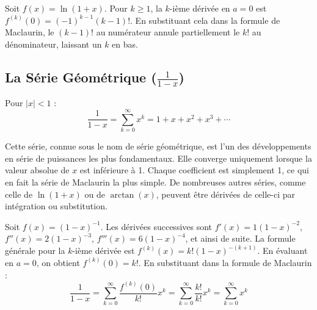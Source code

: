 \begin{proofbox}
Soit $f(x) = \ln(1+x)$. Pour $k \ge 1$, la $k$-ième dérivée en $a=0$ est $f^{(k)}(0) = (-1)^{k-1} (k-1)!$. En substituant cela dans la formule de Maclaurin, le $(k-1)!$ au numérateur annule partiellement le $k!$ au dénominateur, laissant un $k$ en bas.
\end{proofbox}

\subsection{La Série Géométrique ($\frac{1}{1-x}$)}

\begin{theorembox}
Pour $|x| < 1$ :
$$ \frac{1}{1-x} = \sum_{k=0}^{\infty} x^k = 1 + x + x^2 + x^3 + \cdots $$
\end{theorembox}

\begin{intuitionbox}
Cette série, connue sous le nom de série géométrique, est l'un des développements en série de puissances les plus fondamentaux. Elle converge uniquement lorsque la valeur absolue de $x$ est inférieure à 1. Chaque coefficient est simplement 1, ce qui en fait la série de Maclaurin la plus simple. De nombreuses autres séries, comme celle de $\ln(1+x)$ ou de $\arctan(x)$, peuvent être dérivées de celle-ci par intégration ou substitution.
\end{intuitionbox}

\begin{proofbox}
Soit $f(x) = (1-x)^{-1}$. Les dérivées successives sont $f'(x) = 1(1-x)^{-2}$, $f''(x) = 2(1-x)^{-3}$, $f'''(x) = 6(1-x)^{-4}$, et ainsi de suite. La formule générale pour la $k$-ième dérivée est $f^{(k)}(x) = k!(1-x)^{-(k+1)}$. En évaluant en $a=0$, on obtient $f^{(k)}(0) = k!$. En substituant dans la formule de Maclaurin :
$$ \frac{1}{1-x} = \sum_{k=0}^{\infty} \frac{f^{(k)}(0)}{k!} x^k = \sum_{k=0}^{\infty} \frac{k!}{k!} x^k = \sum_{k=0}^{\infty} x^k $$
\end{proofbox}